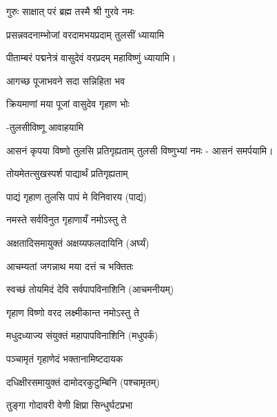 
{गुरुः साक्षात् परं ब्रह्म तस्मै श्री गुरवे नमः}

\begin{center}

{प्रसन्नवदनाम्भोजां वरदामभयप्रदाम्}
तुलसीं ध्यायामि

{पीताम्बरं पद्मनेत्रं वासुदेवं वरप्रदम्}
महाविष्णुं ध्यायामि।

{आगच्छ पूजाभवने सदा सन्निहिता भव}

{क्रियमाणां मया पूजां वासुदेव गृहाण भोः} 

-तुलसीविष्णू आवाहयामि

{आसनं कृपया विष्णो तुलसि प्रतिगृह्यताम्}
तुलसी विष्णुभ्यां नमः - आसनं समर्पयामि।

{तोयमेतत्सुखस्पर्श पाद्यार्थं प्रतिगृह्यताम्}

{पाद्यं गृहाण तुलसि पापं मे विनिवारय} (पाद्यं)

{नमस्ते सर्वविनुत गृहाणायँ नमोऽस्तु ते}

{अक्षतादिसमायुक्तं अक्षय्यफलदायिनि} (अर्घ्यं)

{आचम्यतां जगन्नाथ मया दत्तं च भक्तितः}

{स्वच्छं तोयमिदं देवि सर्वपापविनाशिनि } (आचमनीयम्)


{गृहाण विष्णो वरद लक्ष्मीकान्त नमोऽस्तु ते}

{मधुदध्याज्य संयुक्तं महापापविनाशिनि }
(मधुपर्कं)

{पञ्चामृतं गृहाणेदं भक्तानामिष्टदायक}

{दधिक्षीरसमायुक्तं दामोदरकुटुम्बिनि}
(पश्चामृतम्)

{तुङ्गा गोदावरी वेणी क्षिप्रा सिन्धुर्घटप्रभा}


\end{center}
